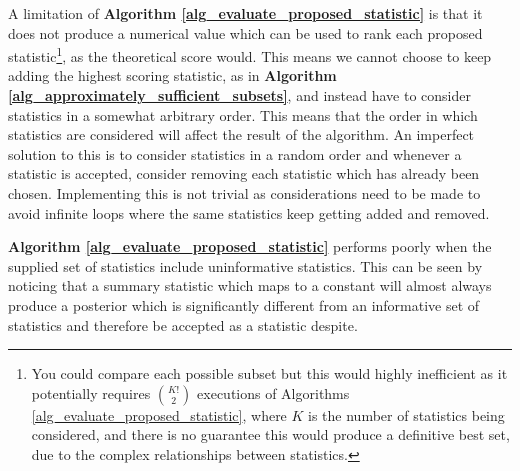 \documentclass[bibliography=totoc,11pt,a4paper,margin=0]{article}
\theoremstyle{break}
\begin{document}
  \par A limitation of \textbf{Algorithm \ref{alg_evaluate_proposed_statistic}} is that it does not produce a numerical value which can be used to rank each proposed statistic\footnote{You could compare each possible subset but this would highly inefficient as it potentially requires ${K! \choose 2}$ executions of Algorithms \ref{alg_evaluate_proposed_statistic}, where $K$ is the number of statistics being considered, and there is no guarantee this would produce a definitive best set, due to the complex relationships between statistics.}, as the theoretical score would. This means we cannot choose to keep adding the highest scoring statistic, as in \textbf{Algorithm \ref{alg_approximately_sufficient_subsets}}, and instead have to consider statistics in a somewhat arbitrary order. This means that the order in which statistics are considered will affect the result of the algorithm. An imperfect solution to this is to consider statistics in a random order and whenever a statistic is accepted, consider removing each statistic which has already been chosen. Implementing this is not trivial as considerations need to be made to avoid infinite loops where the same statistics keep getting added and removed.

  \par \textbf{Algorithm \ref{alg_evaluate_proposed_statistic}} performs poorly when the supplied set of statistics include uninformative statistics. This can be seen by noticing that a summary statistic which maps to a constant will almost always produce a posterior which is significantly different from an informative set of statistics and therefore be accepted as a statistic despite.

\end{document}
